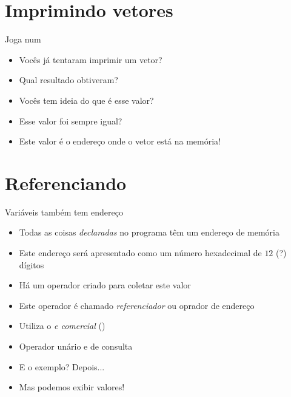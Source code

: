 \documentclass[14pt]{beamer}
\subtitle{Não aponte para mim}
\begin{document}
	
	\begin{frame}
		\titlepage
	\end{frame}

	\begin{frame}
		\tableofcontents
	\end{frame}

	\section{Imprimindo vetores}
		\begin{frame}{Joga num \basicCode{cout}}
			\begin{itemize}
				\presentationPause\item Vocês já tentaram imprimir um vetor?
				\presentationPause\item Qual resultado obtiveram?
				\presentationPause\item Vocês tem ideia do que é esse valor?
				\presentationPause\item Esse valor foi sempre igual?
			\end{itemize}
			\presentationPause
			\begin{itemize}
				\presentationPause\item Este valor é o endereço onde o vetor está na memória!
			\end{itemize}
		\end{frame}

	\section{Referenciando}
		\begin{frame}{Variáveis também tem endereço}
			\begin{itemize}
				\presentationPause\item Todas as coisas \emph{declaradas} no programa têm um endereço de memória
				\presentationPause\item Este endereço será apresentado como um número hexadecimal de $12$ (?) dígitos
				\presentationPause\item Há um operador criado para coletar este valor
				\presentationPause\item Este operador é chamado \emph{referenciador} \presentationPause ou oprador de endereço
				\presentationPause\item Utiliza o \emph{e comercial} (\basicCode{\&})
				\presentationPause\item Operador unário e de consulta
			\end{itemize}
			\presentationPause
			\begin{itemize}
				\presentationPause\item E o exemplo? \presentationPause Depois...
				\presentationPause\item Mas podemos exibir valores!
			\end{itemize}
		\end{frame}
\end{document}
